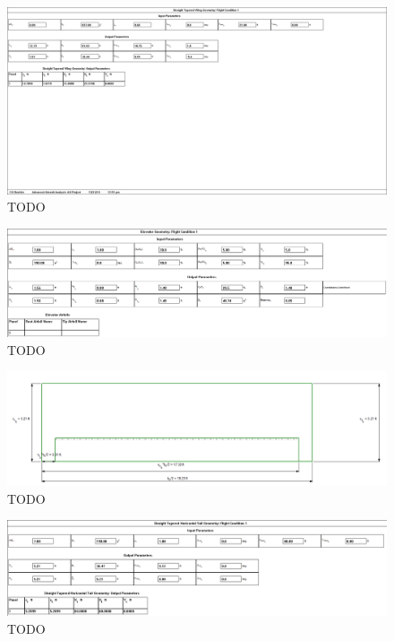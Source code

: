 \documentclass[conf]{new-aiaa}
\begin{document}
\begin{figure}
    \includegraphics[width=\textwidth]{Report3Printouts/changedwing.png}
    \caption{TODO}
    \label{fig:TODO}
\end{figure}

\begin{figure}
    \includegraphics[width=\textwidth]{Report3Printouts/Empannage/Horizontal_elevator_cropped.png}
    \caption{TODO}
    \label{fig:TODO}
\end{figure}

\begin{figure}
    \includegraphics[width=\textwidth]{Report3Printouts/Empannage/Horizontal_elevator_plot.png}
    \caption{TODO}
    \label{fig:TODO}
\end{figure}


\begin{figure}
    \includegraphics[width=\textwidth]{Report3Printouts/Empannage/Horizontal_geometry_cropped.png}
    \caption{TODO}
    \label{fig:TODO}
\end{figure}
\end{document}
